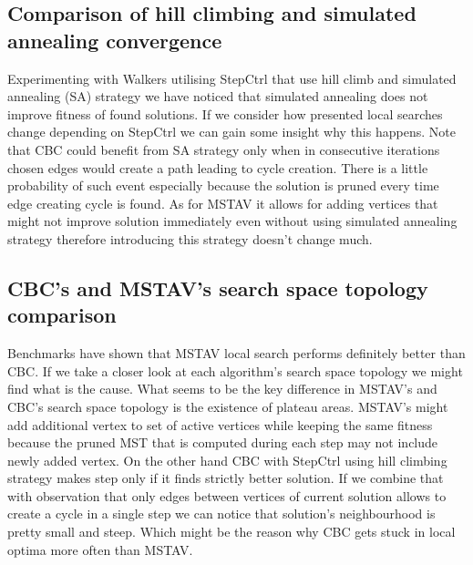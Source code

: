 \subsection{Comparison of hill climbing and simulated annealing convergence}
\FloatBarrier
Experimenting with Walkers utilising StepCtrl that use hill climb and simulated annealing (SA) strategy we have noticed that simulated annealing does not improve fitness of found solutions.
If we consider how presented local searches change depending on StepCtrl we can gain some insight why this happens.
Note that CBC could benefit from SA strategy only when in consecutive iterations chosen edges would create a path leading to cycle creation. There is a little probability of such event especially because the solution is pruned every time edge creating cycle is found. As for MSTAV it allows for adding vertices that might not improve solution immediately even without using simulated annealing strategy therefore introducing this strategy doesn't change much.

\begin{figure}[hb]

\end{figure}
\begin{figure}[hb]

\end{figure}
\FloatBarrier

\subsection{CBC's and MSTAV's search space topology comparison}
\FloatBarrier
Benchmarks have shown that MSTAV local search performs definitely better than CBC. If we take a closer look at each algorithm's search space topology we might find what is the cause. What seems to be the key difference in MSTAV's and CBC's search space topology is the existence of plateau areas. MSTAV's might add additional vertex to set of active vertices while keeping the same fitness because the pruned MST that is computed during each step may not include newly added vertex. On the other hand CBC with StepCtrl using hill climbing strategy makes step only if it finds strictly better solution. If we combine that with observation that only edges between vertices of current solution allows to create a cycle in a single step we can notice that solution's neighbourhood is pretty small and steep. Which might be the reason why CBC gets stuck in local optima more often than MSTAV.
\begin{figure}[hb]

\end{figure}
\FloatBarrier

